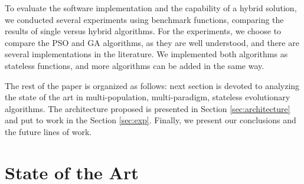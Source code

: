 \documentclass[runningheads]{llncs}
\begin{document}


To evaluate the software implementation and the capability of a hybrid solution,
we conducted several experiments using benchmark functions, comparing the
results of single versus hybrid algorithms. For the experiments, we choose to
compare the PSO and GA algorithms, as they are well understood, and there are
several implementations in the literature. We implemented both algorithms as
stateless functions, and more algorithms can be added in the same way.



The rest of the paper is organized as follows: next section is devoted
to analyzing the state of the art in multi-population, multi-paradigm,
stateless evolutionary algorithms. The architecture proposed is
presented in Section \ref{sec:architecture} and put to work in the
Section \ref{sec:exp}. Finally, we present our conclusions and the
future lines of work.

\section{State of the Art}

\end{document}
